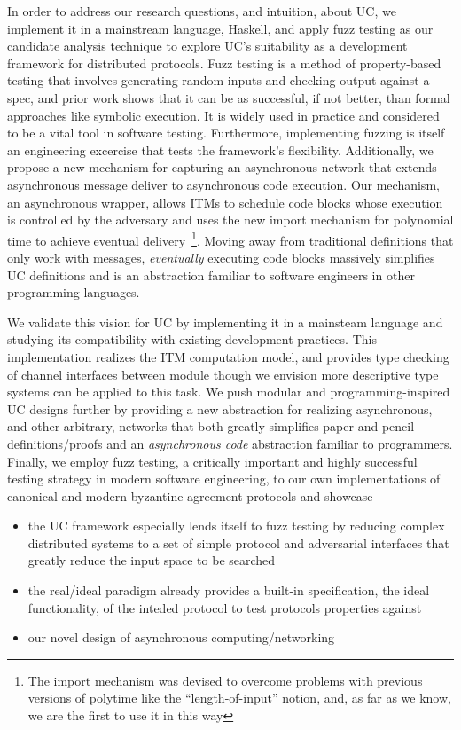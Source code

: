 In order to address our research questions, and intuition, about UC, we implement it in a mainstream language, Haskell, and apply fuzz testing as our candidate analysis technique to explore UC's suitability as a development framework for distributed protocols.
Fuzz testing is a method of property-based testing that involves generating random inputs and checking output against a spec, and prior work shows that it can be as successful, if not better, than formal approaches like symbolic execution. 
It is widely used in practice and considered to be a vital tool in software testing.
Furthermore, implementing fuzzing is itself an engineering excercise that tests the framework's flexibility. 
Additionally, we propose a new mechanism for capturing an asynchronous network that extends asynchronous message deliver to asynchronous code execution. 
Our mechanism, an asynchronous wrapper, allows ITMs to schedule code blocks whose execution is controlled by the adversary and uses the new import mechanism for polynomial time to achieve eventual delivery~\footnote{The import mechanism was devised to overcome problems with previous versions of polytime like the ``length-of-input'' notion, and, as far as we know, we are the first to use it in this way}.
Moving away from traditional definitions that only work with messages, \emph{eventually} executing code blocks massively simplifies UC definitions and is an abstraction familiar to software engineers in other programming languages.



We validate this vision for UC by implementing it in a mainsteam language and studying its compatibility with existing development practices. 
 This implementation realizes the ITM computation model, and provides type checking of channel interfaces between module though we envision more descriptive type systems can be applied to this task.
We push modular and programming-inspired UC designs further by providing a new abstraction for realizing asynchronous, and other arbitrary, networks that both greatly simplifies paper-and-pencil definitions/proofs and an \emph{asynchronous code} abstraction familiar to programmers.
Finally, we employ fuzz testing, a critically important and highly successful testing strategy in modern software engineering, to our own implementations of canonical and modern byzantine agreement protocols and showcase
\begin{itemize}
\item the UC framework especially lends itself to fuzz testing by reducing complex distributed systems to a set of simple protocol and adversarial interfaces that greatly reduce the input space to be searched
\item the real/ideal paradigm already provides a built-in specification, the ideal functionality, of the inteded protocol to test protocols properties against
\item our novel design of asynchronous computing/networking 
\end{itemize}

